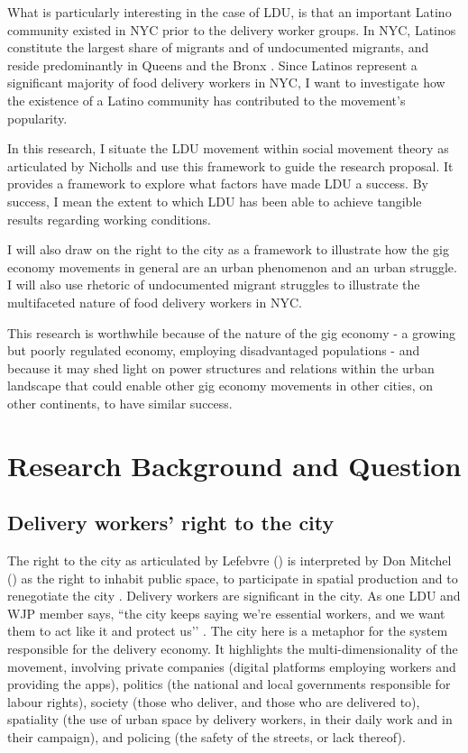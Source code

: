 \documentclass{article}[12pt]
\begin{document}
What is particularly interesting in the case of LDU, is that an important Latino community existed in NYC prior to the delivery worker groups. In NYC, Latinos constitute the largest share of migrants and of undocumented migrants, and reside predominantly in Queens and the Bronx \parencite{nycimmigrantpopulation2021}. Since Latinos represent a significant majority of food delivery workers in NYC, I want to investigate how the existence of a Latino community has contributed to the movement’s popularity.

In this research, I situate the LDU movement within social movement theory as articulated by Nicholls and use this framework to guide the research proposal. It provides a framework to explore what factors have made LDU a success. By success, I mean the extent to which LDU has been able to achieve tangible results regarding working conditions.

I will also draw on the right to the city as a framework to illustrate how the gig economy movements in general are an urban phenomenon and an urban struggle. I will also use rhetoric of undocumented migrant struggles to illustrate the multifaceted nature of food delivery workers in NYC.

This research is worthwhile because of the nature of the gig economy - a growing but poorly regulated economy, employing disadvantaged populations - and because it may shed light on power structures and relations within the urban landscape that could enable other gig economy movements in other cities, on other continents, to have similar success.

\section{Research Background and Question}

\subsection{Delivery workers’ right to the city}

The right to the city as articulated by Lefebvre (\citeyear{lefebvre1995writings}) is interpreted by Don Mitchel (\citeyear{mitchell2003right}) as the right to inhabit public space, to participate in spatial production and to renegotiate the city \parencite{lee2018delivering}. Delivery workers are significant in the city. As one LDU and WJP member says, ``the city keeps saying we’re essential workers, and we want them to act like it and protect us’’ \parencite{ldutestimonials}. The city here is a metaphor for the system responsible for the delivery economy. It highlights the multi-dimensionality of the movement, involving private companies (digital platforms employing workers and providing the apps), politics (the national and local governments responsible for labour rights), society (those who deliver, and those who are delivered to), spatiality (the use of urban space by delivery workers, in their daily work and in their campaign), and policing (the safety of the streets, or lack thereof).
\end{document}
